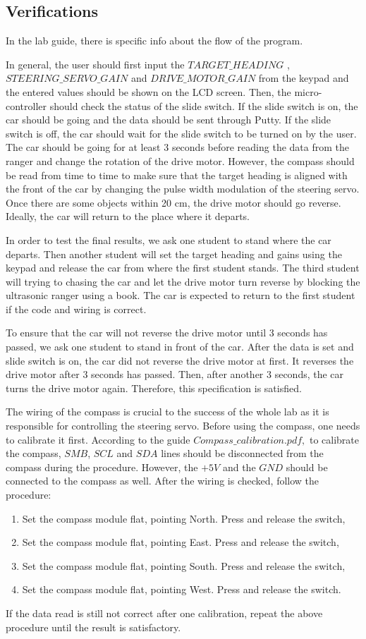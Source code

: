 \documentclass[12pt]{article}
\begin{document}
\subsection{Verifications}
In the lab guide, there is specific info about the flow of the program. \par
In general, the user should first input the $TARGET\_HEADING$ , $STEERING\_SERVO\_GAIN$ and $DRIVE\_MOTOR\_GAIN$ from the keypad and the entered values should be shown on the LCD screen. Then, the micro-controller should check the status of the slide switch. If the slide switch is on, the car should be going and the data should be sent through Putty. If the slide switch is off, the car should wait for the slide switch to be turned on by the user. The car should be going for at least 3 seconds before reading the data from the ranger and change the rotation of the drive motor. However, the compass should be read from time to time to make sure that the target heading is aligned with the front of the car by changing the pulse width modulation of the steering servo. Once there are some objects within 20 cm, the drive motor should go reverse. Ideally, the car will return to the place where it departs.\par
In order to test the final results, we ask one student to stand where the car departs. Then another student will set the target heading and gains using the keypad and release the car from where the first student stands. The third student will trying to chasing the car and let the drive motor turn reverse by blocking the ultrasonic ranger using a book. The car is expected to return to the first student if the code and wiring is correct. \par
To ensure that the car will not reverse the drive motor until 3 seconds has passed, we ask one student to stand in front of the car. After the data is set and slide switch is on, the car did not reverse the drive motor at first. It reverses the drive motor after 3 seconds has passed. Then, after another 3 seconds, the car turns the drive motor again. Therefore, this specification is satisfied. \par
The wiring of the compass is crucial to the success of the whole lab as it is responsible for controlling the steering servo. Before using the compass, one needs to calibrate it first. According to the guide $Compass\_calibration.pdf,$ to calibrate the compass, $SMB$, $SCL$ and $SDA$ lines should be disconnected from the compass during the procedure. However, the $+5V$ and the $GND$ should be connected to the compass as well. After the wiring is checked, follow the procedure:
\begin{enumerate}
  \item Set the compass module flat, pointing North. Press and release the switch,
  \item Set the compass module flat, pointing East. Press and release the switch,
  \item Set the compass module flat, pointing South. Press and release the switch,
  \item Set the compass module flat, pointing West. Press and release the switch.
\end{enumerate}
If the data read is still not correct after one calibration, repeat the above procedure until the result is satisfactory.
\end{document}
